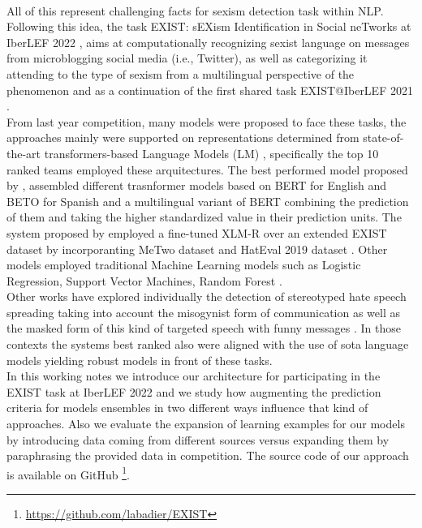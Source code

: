 \documentclass[
]{ceurart}
\begin{document}
\\
All of this represent challenging facts for sexism detection task within  NLP. Following this idea, the task EXIST: sEXism Identification in Social neTworks at IberLEF 2022 \cite{EXIST2022}, aims at computationally recognizing sexist language on messages from microblogging social media (i.e., Twitter), as well as categorizing it attending to the type of sexism from a multilingual perspective of the phenomenon and as a continuation of the first shared task EXIST@IberLEF 2021 \cite{PLN6389}.
\\
From last year competition, many models were proposed to face these tasks, the approaches mainly were supported on representations determined from state-of-the-art transformers-based Language Models (LM) \cite{vaswani2017attention,DBLP:journals/corr/abs-1810-04805,liu2019roberta,CaneteCFP2020}, specifically the top 10 ranked teams employed these arquitectures.  The best performed model proposed by \cite{https://doi.org/10.48550/arxiv.2111.04551}, assembled different trasnformer models based on BERT for English and BETO for Spanish and a multilingual variant of BERT combining the prediction of them and taking the higher standardized value in their prediction units. The system proposed by \cite{Schtz2021AutomaticSD}  employed a fine-tuned XLM-R over an extended EXIST dataset by incorporanting MeTwo  dataset \cite{9281090} and HatEval 2019 dataset \cite{basile-etal-2019-semeval}. Other models employed traditional Machine Learning models such as Logistic Regression, Support Vector Machines, Random Forest \cite{DBLP:conf/sepln/KumarPP21,unedunbased}.\\
Other works have explored individually the detection of stereotyped hate speech spreading taking into account the misogynist form  of communication \cite{basile-etal-2019-semeval,bevendorff:2021a} as well as the masked form of this kind of targeted speech with funny messages \cite{PLN6394,43a63aada26e44b0b5bb110cb1934c04}. In those contexts the systems best ranked also were aligned with the use of sota language models yielding robust models in front of these tasks.\\
In this working notes we introduce our architecture for participating in the EXIST task at IberLEF 2022 and we study how augmenting the prediction criteria for models ensembles in two different ways influence that kind of approaches. Also we evaluate the expansion of learning examples for our models by introducing data coming from different sources versus expanding them by paraphrasing the provided data in competition. The source code of our approach is available on GitHub \footnote{\url{https://github.com/labadier/EXIST}}.
\end{document}
